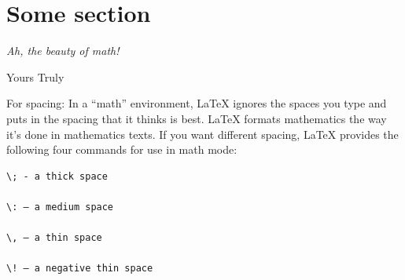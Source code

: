 
\usepackage{epigraph}                                      %
\setlength{\epigraphwidth}{0.8\columnwidth}                %
\section{Some section}
  \epigraph{\emph{Ah, the beauty of math!}}{Yours Truly}

\usepackage{endnotes}
\renewcommand{\theendnote}{\Roman{endnote}}                %
\begingroup
{}
\renewcommand{\enotesize}{\small}
\theendnotes
\endgroup

\usepackage{marginnote}
\renewcommand*{\marginfont}{\footnotesize}

For spacing: In a ``math'' environment, LaTeX ignores the spaces you type and 
puts in the spacing that it thinks is best. LaTeX formats mathematics the
way it’s done in mathematics texts. If you want different spacing, LaTeX 
provides the following four commands for use in math mode: 

\begin{verbatim}
\; - a thick space

\: – a medium space

\, – a thin space

\! – a negative thin space 
  \end{verbatim}

